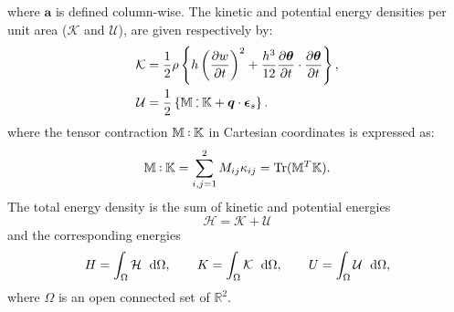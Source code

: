 \documentclass[11t]{article}
\DeclareMathOperator{\Tr}{Tr}
\def\onedot{$\mathsurround0pt\ldotp$}
\def\cddot{%
	\mathbin{\vcenter{\baselineskip.67ex
			\hbox{\onedot}\hbox{\onedot}}%
}}
\begin{document}
{\begin{equation*}
		\end{equation*}
		where $\bm{a}$ is defined column-wise. The kinetic and potential energy densities per unit area ($\mathcal{K}$ and $\mathcal{U}$), are given respectively by:
		\begin{align*}
		\mathcal{K} &= \frac{1}{2} \rho \left\{ h \left(\diffp{w}{t}\right)^2 +  \frac{h^3}{12} \diffp{\bm\theta}{t} \cdot \diffp{\bm\theta}{t} \right\} ,\\
		\mathcal{U} &= \frac{1}{2} \left\{ \mathbb{M} \cddot \mathbb{K} + \bm{q} \cdot \bm{\epsilon}_s \right\} .	
		\end{align*} 
		where the tensor contraction $ \mathbb{M} \cddot \mathbb{K}$ in Cartesian coordinates is expressed as:
		\[\mathbb{M} \cddot \mathbb{K} = \sum_{i,j = 1}^{2} M_{ij} \kappa_{ij} = \Tr(\mathbb{M}^T \mathbb{K}). \]
		The total energy density is the sum of kinetic and potential energies
		\begin{equation}
		\mathcal{H} = \mathcal{K} + \mathcal{U}
		\end{equation}
		and the corresponding energies
		\begin{equation}
		H = \int_{\Omega} \mathcal{H} \ \d\Omega, \qquad K = \int_{\Omega} \mathcal{K} \ \d\Omega, \qquad U = \int_{\Omega} \mathcal{U} \ \d\Omega,
		\end{equation}
		where $\Omega$ is an open connected set of $\mathbb{R}^2$.
	}
	
\end{document}
